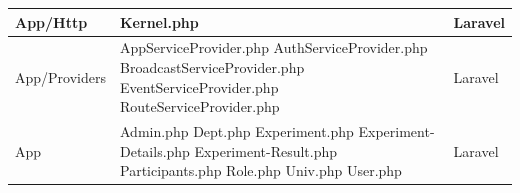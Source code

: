 \documentclass[letterpaper, 10 pt, conference]{ieeeconf}  %
\begin{document}
\begin{table}
\begin{supertabular}{|p{2cm}|L{4cm}|p{1.5cm}|}
    App/Http&Kernel.php&Laravel\\  
    \hline
    App/Providers&AppServiceProvider.php \newline \newline AuthServiceProvider.php \newline \newline BroadcastServiceProvider.php \newline \newline EventServiceProvider.php \newline \newline RouteServiceProvider.php&Laravel\\
    \hline
    App&Admin.php \newline \newline Dept.php \newline \newline Experiment.php \newline\newline Experiment-Details.php \newline\newline Experiment-Result.php \newline\newline Participants.php \newline\newline Role.php \newline\newline Univ.php \newline\newline User.php&Laravel\\
    \hline\hline
    
\end{supertabular}
\end{table}
   
\end{document}
